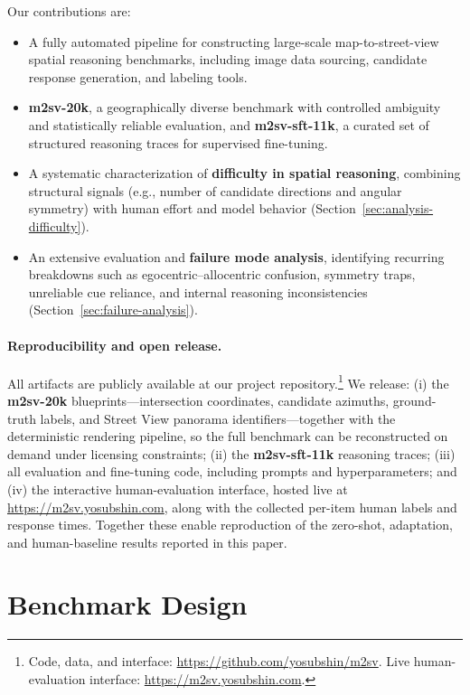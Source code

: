 \documentclass{article}
\begin{document}
Our contributions are:
\begin{itemize}
  \item A fully automated pipeline for constructing large-scale map-to-street-view
  spatial reasoning benchmarks, including image data sourcing, candidate response
  generation, and labeling tools.
  \item \textbf{m2sv-20k}, a geographically diverse benchmark with controlled
  ambiguity and statistically reliable evaluation, and \textbf{m2sv-sft-11k}, a
  curated set of structured reasoning traces for supervised fine-tuning.
  \item A systematic characterization of \textbf{difficulty in spatial reasoning},
  combining structural signals (e.g., number of candidate directions and angular
  symmetry) with human effort and model behavior (Section~\ref{sec:analysis-difficulty}).
  \item An extensive evaluation and \textbf{failure mode analysis}, identifying
  recurring breakdowns such as egocentric--allocentric confusion, symmetry traps,
  unreliable cue reliance, and internal reasoning inconsistencies
  (Section~\ref{sec:failure-analysis}).
\end{itemize}

\paragraph{Reproducibility and open release.}
All artifacts are publicly available at our project repository.\footnote{Code,
data, and interface: \url{https://github.com/yosubshin/m2sv}. Live
human-evaluation interface: \url{https://m2sv.yosubshin.com}.} We release: (i) the
\textbf{m2sv-20k} blueprints---intersection coordinates, candidate azimuths,
ground-truth labels, and Street View panorama identifiers---together with the
deterministic rendering pipeline, so the full benchmark can be reconstructed on
demand under licensing constraints; (ii) the \textbf{m2sv-sft-11k} reasoning
traces; (iii) all evaluation and fine-tuning code, including prompts and
hyperparameters; and (iv) the interactive human-evaluation interface, hosted live
at \url{https://m2sv.yosubshin.com}, along with the collected per-item human
labels and response times. Together these enable reproduction of the zero-shot,
adaptation, and human-baseline results reported in this paper.

\section{Benchmark Design}
\end{document}

